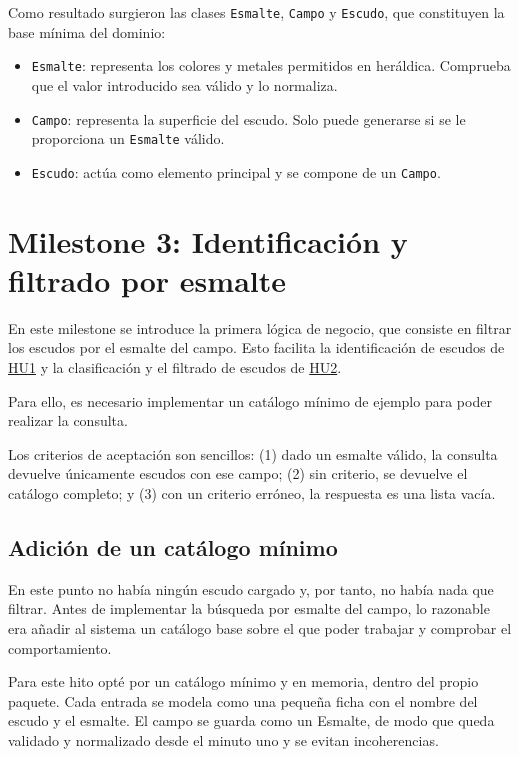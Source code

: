 Como resultado surgieron las clases \texttt{Esmalte}, \texttt{Campo} y \texttt{Escudo}, que constituyen 
la base mínima del dominio:

\begin{itemize}
    \item \texttt{Esmalte}: representa los colores y metales permitidos en heráldica. 
    Comprueba que el valor introducido sea válido y lo normaliza.
    \item \texttt{Campo}: representa la superficie del escudo. Solo puede generarse 
    si se le proporciona un \texttt{Esmalte} válido.
    \item \texttt{Escudo}: actúa como elemento principal y se compone de un \texttt{Campo}.
\end{itemize}

\section{Milestone 3: Identificación y filtrado por esmalte}

En este milestone se introduce la primera lógica de negocio, que consiste en filtrar los escudos
por el esmalte del campo. Esto facilita la identificación de escudos de \hyperref[sec:hu1]{HU1} y 
la clasificación y el filtrado de escudos de \hyperref[sec:hu2]{HU2}.

Para ello, es necesario implementar un catálogo mínimo de ejemplo para poder realizar la consulta.

Los criterios de aceptación son sencillos: (1) dado un esmalte válido, la consulta devuelve 
únicamente escudos con ese campo; (2) sin criterio, se devuelve el catálogo completo; y 
(3) con un criterio erróneo, la respuesta es una lista vacía.

\subsection{Adición de un catálogo mínimo}

En este punto no había ningún escudo cargado y, por tanto, no había nada que filtrar. Antes 
de implementar la búsqueda por esmalte del campo, lo razonable era añadir al sistema un catálogo 
base sobre el que poder trabajar y comprobar el comportamiento.

Para este hito opté por un catálogo mínimo y en memoria, dentro del propio paquete. 
Cada entrada se modela como una pequeña ficha con el nombre del escudo y el esmalte.
El campo se guarda como un Esmalte, de modo que queda validado y normalizado desde
el minuto uno y se evitan incoherencias.

